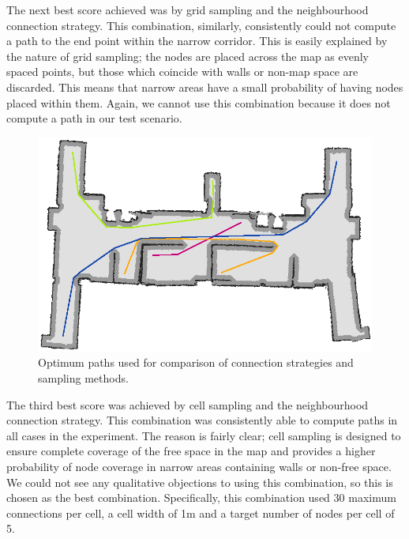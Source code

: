 \documentclass[conference]{IEEEtran}
\begin{document}
The next best score achieved was by grid sampling and the neighbourhood connection strategy. This combination, similarly, consistently could not compute a path to the end point within the narrow corridor. This is easily explained by the nature of grid sampling; the nodes are placed across the map as evenly spaced points, but those which coincide with walls or non-map space are discarded. This means that narrow areas have a small probability of having nodes placed within them. Again, we cannot use this combination because it does not compute a path in our test scenario.
\begin{figure}
  \includegraphics[width=\columnwidth]{optimumpaths}
  \caption{Optimum paths used for comparison of connection strategies and sampling methods.}
  \label{fig:optimum}
\end{figure}
The third best score was achieved by cell sampling and the neighbourhood connection strategy. This combination was consistently able to compute paths in all cases in the experiment. The reason is fairly clear; cell sampling is designed to ensure complete coverage of the free space in the map and provides a higher probability of node coverage in narrow areas containing walls or non-free space. We could not see any qualitative objections to using this combination, so this is chosen as the best combination. Specifically, this combination used 30 maximum connections per cell, a cell width of 1m and a target number of nodes per cell of 5.
\end{document}
